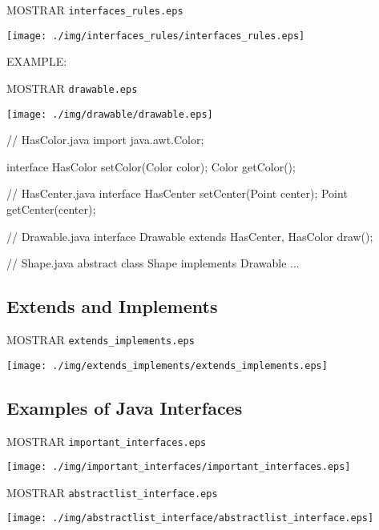 \documentclass[a4paper, 9pt]{extarticle}
\begin{document}
MOSTRAR \verb+interfaces_rules.eps+
\begin{center}
  \texttt{[image: ./img/interfaces\_rules/interfaces\_rules.eps]}
\end{center}

EXAMPLE:

MOSTRAR \verb+drawable.eps+
\begin{center}
  \texttt{[image: ./img/drawable/drawable.eps]}
\end{center}

\begin{blackboard}
// HasColor.java
import java.awt.Color;

interface HasColor {
  setColor(Color color);
  Color getColor();
}

// HasCenter.java
interface HasCenter {
  setCenter(Point center);
  Point getCenter(center);
}

// Drawable.java
interface Drawable extends HasCenter, HasColor {
  draw();
}

// Shape.java
abstract class Shape implements Drawable {
  ...
}
\end{blackboard}


\subsection{Extends and Implements}

MOSTRAR \verb+extends_implements.eps+
\begin{center}
  \texttt{[image: ./img/extends\_implements/extends\_implements.eps]}
\end{center}

\subsection{Examples of Java Interfaces}

MOSTRAR \verb+important_interfaces.eps+
\begin{center}
  \texttt{[image: ./img/important\_interfaces/important\_interfaces.eps]}
\end{center}

MOSTRAR \verb+abstractlist_interface.eps+
\begin{center}
  \texttt{[image: ./img/abstractlist\_interface/abstractlist\_interface.eps]}
\end{center}
\end{document}
